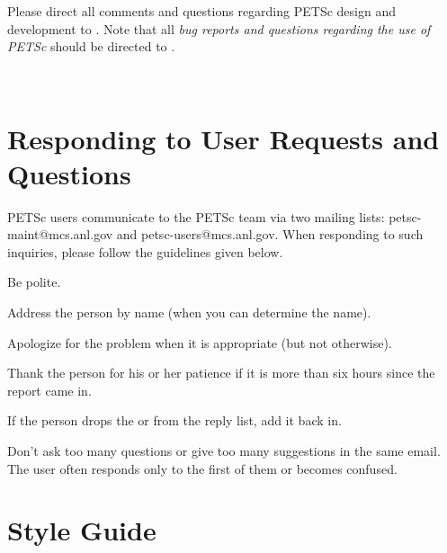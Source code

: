 \vspace{1cm}

Please direct all comments and questions regarding PETSc design and
development to .  Note that all {\em
bug reports and questions regarding the use of PETSc} should
be directed to .

%
%

\newpage
\hbox{ }
\newpage

\tableofcontents

\pagestyle{fancy}
\chapter{Responding to User Requests and Questions}

PETSc users communicate to the PETSc team via two mailing lists:
petsc-maint@mcs.anl.gov and petsc-users@mcs.anl.gov. When responding
to such inquiries, please follow the guidelines given below.

\begin{tightitemize}
\item Be polite.
\item Address the person by name (when you can determine the name).
\item Apologize for the problem when it is appropriate (but not otherwise).
\item Thank the person for his or her patience if it is more than six hours since the report came in.
\item If the person drops the  or  from the reply list, add it back in.
\item Don't ask too many questions or give too many suggestions in the same email. The user often responds only to the first of them or becomes confused.
\end{tightitemize}

\chapter{Style Guide}\label{chapter:styleguide}

